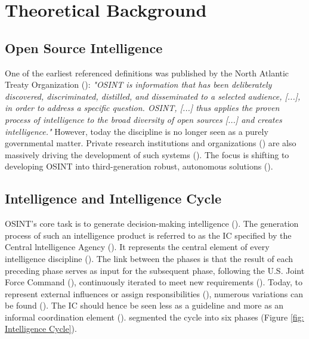 \documentclass[10pt]{article}
\begin{document}
\section{Theoretical Background} \label{sec:theoreticalbackground}


\subsection{Open Source Intelligence}

One of the earliest referenced definitions
was published by the North Atlantic Treaty Organization (\textcite{NorthAtlanticTreatyOrganization.2001}): \textit{"OSINT is information that has been
    deliberately discovered, discriminated, distilled, and disseminated to a selected audience,
    [...], in order to address a specific question. OSINT, [...] thus applies the proven
    process of intelligence to the broad diversity of open sources [...] and creates
    intelligence."} However, today the discipline is no longer seen as a purely governmental
matter. Private research institutions and organizations (\cite{Bohm.2021}) are
also massively driving the development of such systems
(\cite{Dokman.2020}). The focus is shifting to
developing OSINT into third-generation robust, autonomous solutions (\cite{PastorGalindo.2019}).

\subsection{Intelligence and Intelligence Cycle}

OSINT's core task is to generate decision-making intelligence
(\cite{NorthAtlanticTreatyOrganization.2001}). The generation process of such an intelligence product
is referred to as the IC specified by the Central lntelligence Agency (\cite{CentralIntelligenceAgency.1987}).
It represents the central element of every intelligence discipline (\cite{Reuser.2017}).
The link between the phases is that the result of each preceding phase serves as input for the subsequent phase, following the U.S. Joint Force Command (\cite{JointChiefsofStaffU.S.Army.2013}), continuously iterated to meet new requirements (\cite{Gibson.2016}).
Today, to represent external influences or assign responsibilities (\cite{Lowenthal.2020,Phythian.2013}), numerous
variations can be found (\cite{Reuser.2017}). The IC should hence be seen less as a guideline and more as an informal
coordination element (\cite{Hwang.2022}). \textcite{JointChiefsofStaffU.S.Army.2013} segmented the cycle into six phases (Figure \ref{fig: Intelligence Cycle}).
\end{document}
